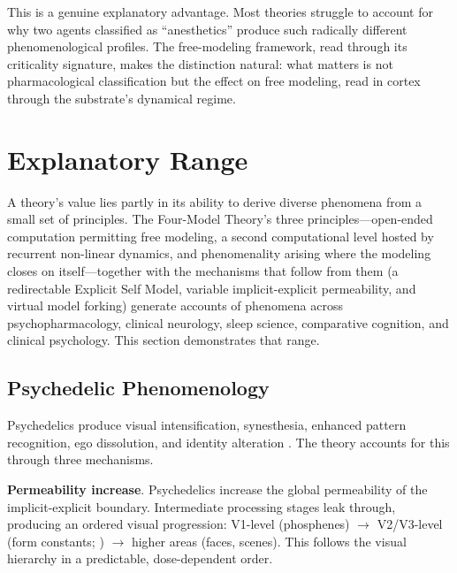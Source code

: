 \documentclass[12pt]{article}
\begin{document}
This is a genuine explanatory advantage. Most theories struggle to account for why two agents classified as ``anesthetics'' produce such radically different phenomenological profiles. The free-modeling framework, read through its criticality signature, makes the distinction natural: what matters is not pharmacological classification but the effect on free modeling, read in cortex through the substrate's dynamical regime.



\section{Explanatory Range}

A theory's value lies partly in its ability to derive diverse phenomena from a small set of principles. The Four-Model Theory's three principles---\hspace{0pt}open-ended computation permitting free modeling, a second computational level hosted by recurrent non-linear dynamics, and phenomenality arising where the modeling closes on itself---\hspace{0pt}together with the mechanisms that follow from them (a redirectable Explicit Self Model, variable implicit-explicit permeability, and virtual model forking) generate accounts of phenomena across psychopharmacology, clinical neurology, sleep science, comparative cognition, and clinical psychology. This section demonstrates that range.


\subsection{Psychedelic Phenomenology}

Psychedelics produce visual intensification, synesthesia, enhanced pattern recognition, ego dissolution, and identity alteration \citep{CarhartHarris2012,CarhartHarris2016,Timmermann2019,Timmermann2023}. The theory accounts for this through three mechanisms.

\textbf{Permeability increase}. Psychedelics increase the global permeability of the implicit-explicit boundary. Intermediate processing stages leak through, producing an ordered visual progression: V1-level (phosphenes) $\to$ V2/V3-level (form constants; \citealp{Kluver1966}) $\to$ higher areas (faces, scenes). This follows the visual hierarchy in a predictable, dose-dependent order.
\end{document}
